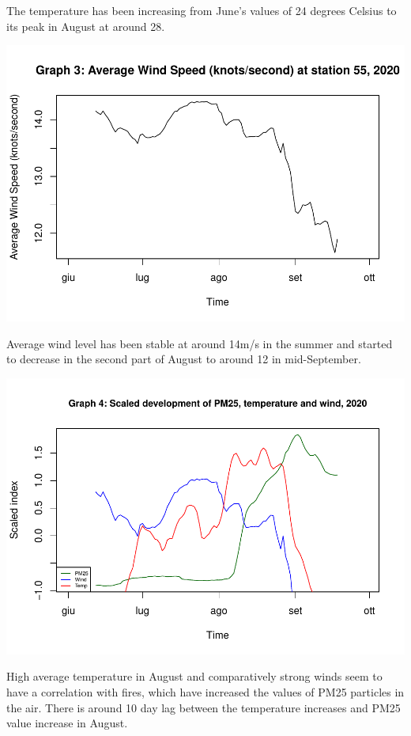 \documentclass[
]{article}
\begin{document}
The temperature has been increasing from June's values of 24 degrees
Celsius to its peak in August at around 28.

\begin{center}\includegraphics[width=0.75\linewidth,height=0.75\textheight]{finalproject_files/figure-latex/ts wind-1} \end{center}

Average wind level has been stable at around 14m/s in the summer and
started to decrease in the second part of August to around 12 in
mid-September.

\begin{center}\includegraphics[width=0.75\linewidth,height=0.75\textheight]{finalproject_files/figure-latex/compare-1} \end{center}

High average temperature in August and comparatively strong winds seem
to have a correlation with fires, which have increased the values of
PM25 particles in the air. There is around 10 day lag between the
temperature increases and PM25 value increase in August.
\end{document}
